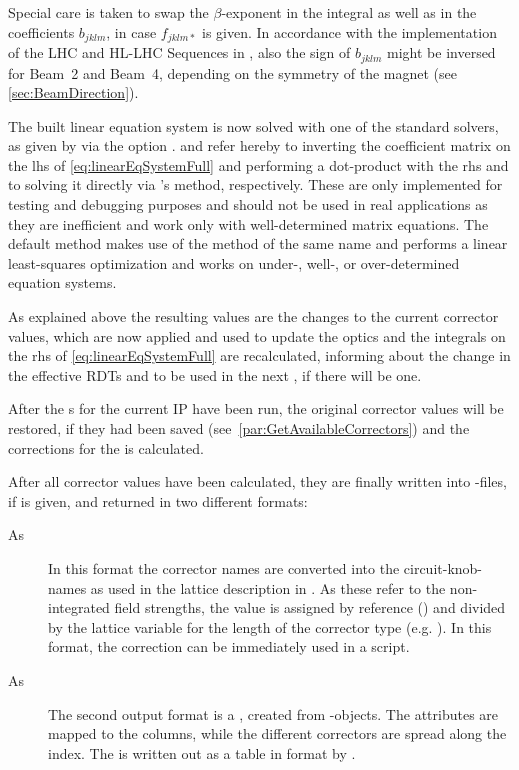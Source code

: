 Special care is taken to swap the $\beta$-exponent in the integral as well as in the coefficients $b_{jklm}$, in case $f_{jklm*}$ is given.
In accordance with the implementation of the LHC and HL-LHC Sequences in , also the sign of $b_{jklm}$ might be inversed for Beam~2 
and Beam~4, depending on the symmetry of the magnet (see \cref{sec:BeamDirection}). 
 

\label{par:SolveEquationSystem}

The built linear equation system is now solved with one of the standard solvers, as given by via the option .
 and  refer hereby to inverting the coefficient matrix on the lhs of \cref{eq:linearEqSystemFull} 
and performing a dot-product with the rhs and to solving it directly via 's  method, respectively.
These are only implemented for testing and debugging purposes and should not be used in real applications as they are inefficient
and work only with well-determined matrix equations.
The default method  makes use of the  method of the same name and performs a linear least-squares optimization
and works on under-, well-, or over-determined equation systems.

As explained above the resulting values are the changes to the current corrector values, 
which are now applied and used to update the optics and the integrals on the rhs of \cref{eq:linearEqSystemFull} are
recalculated, informing about the change in the effective RDTs and to be used in the next , if there will be one. 

After the s for the current IP have been run,
the original corrector values will be restored, if they had been saved (see~\cref{par:GetAvailableCorrectors}) 
and the corrections for the  is calculated.


\label{par:Output}
After all corrector values have been calculated, they are finally written into -files, if  is given, and returned 
in two different formats:
\begin{description}
  \item[As ] In this format the corrector names are converted into the circuit-knob-names as used in the lattice description in .
                        As these refer to the non-integrated field strengths, the value is assigned by reference (\ttt{:=}) and divided by 
                        the lattice variable for the length of the corrector type (e.g. ).
                        In this format, the correction can be immediately used in a  script.    
  \item[As ] The second output format is a , created from -objects. 
                        The attributes are mapped to the columns, while the different correctors are spread along the index.
                        The  is written out as a table in  format by .
\end{description}


